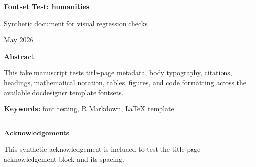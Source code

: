 \documentclass[12pt]{article}
\newif\ifdocdesigneranon
\begin{document}
\begin{titlepage}
\thispagestyle{empty}

\vspace*{0.14\textheight}
\begin{center}


{\LARGE\bfseries Fontset Test: humanities\par}

\vspace{0.25em}
{\large Synthetic document for visual regression checks\par}

\vspace{2em}

\begin{singlespace}
{\normalsize

\docdesignerauthorblock

\par\vspace{2\baselineskip}
\docdesignerseriesblock

\ifdocdesigneranon\else
\vspace{0.5em}
{\small May 2026}\par
\fi

}
\end{singlespace}


\vspace{2em}

\begin{minipage}{0.8\textwidth}
\small\singlespacing
\textbf{Abstract}\par\vspace{0.25em}
This fake manuscript tests title-page metadata, body typography,
citations, headings, mathematical notation, tables, figures, and code
formatting across the available docdesigner template fontsets.
\par\vspace{1em}
\noindent\textbf{Keywords: }font testing, R Markdown, LaTeX template
\end{minipage}

\vfill

\ifdocdesigneranon\else
\begin{minipage}{0.8\textwidth}
\footnotesize\singlespacing
\noindent\rule{0.3\textwidth}{0.4pt}\par
\textbf{Acknowledgements}\par
This synthetic acknowledgement is included to test the title-page
acknowledgement block and its spacing.
\end{minipage}
\fi

\end{center}
\end{titlepage}
\fi\fi
\fi\fi
\end{document}
